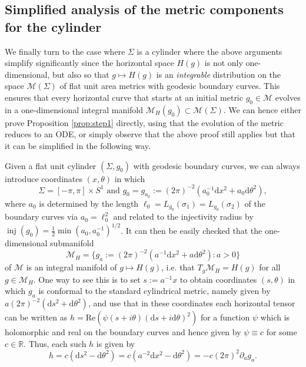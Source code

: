 \documentclass[10pt,reqno]{amsart}
\theoremstyle{plain}
\theoremstyle{definition}
\numberwithin{equation}{section}
\newcommand{\si}{\sigma}
\newcommand{\Si}{\Sigma}
\newcommand{\R}{\ensuremath{{\mathbb R}}}
\DeclareMathOperator{\inj}{inj}
\newcommand{\beq}{\begin{equation}}
\newcommand{\eeq}{\end{equation}}
\newcommand{\dd}{\mathrm{d}} %
\newcommand{\MM}{\mathcal{M}} %
\newcommand{\Rea}{\text{Re}}
\newcommand{\p}{\partial} %
\begin{document}
\subsection{Simplified analysis of the metric components for the cylinder}\label{subsec:cylinder}

We finally turn to the case where $\Si$ is a cylinder where the above arguments simplify significantly since the horizontal space $H(g)$ is not only one-dimensional, but also so that $g\mapsto H(g)$ is an \emph{integrable} distribution on the space $\MM(\Si)$ of flat unit area metrics with geodesic boundary curves. This ensures that every horizontal curve that starts at an initial metric $g_0\in \MM$ evolves in a one-dimensional integral manifold $\MM_H(g_0)\subset \MM(\Si)$. We can hence  either prove Proposition \ref{prop:step1} directly, using that the evolution of the metric reduces to an ODE, or simply observe that the above proof still applies but that it can be simplified in the following way. 

Given a flat unit cylinder $(\Si,g_0)$ with geodesic boundary curves, we can always introduce coordinates $(x,\theta)$ in which 
\beq\label{def:cyl-simple} 
    \Si= [-\pi,\pi]\times S^1 \text{ and } g_0= g_{a_0}:=(2\pi)^{-2} (a_0^{-1} \dd x^2+ a_0 \dd\theta^2),
\eeq
where $a_0$ is determined by the length $\ell_0=L_{g_0}(\si_1)=L_{g_0}(\si_2)$ of the boundary curves via $a_0=\ell_0^2$ and related to the injectivity radius by $\inj(g_0)=\frac12\min(a_0,a_0^{-1})^{1/2}$. It can then be easily checked that the one-dimensional submanifold 
\begin{equation*}
    \MM_H = \{g_a := (2\pi)^{-2} (a^{-1} \dd x^2+ a \dd\theta^2): a > 0\} 
\end{equation*}
of $\MM$ is an integral manifold of $g\mapsto H(g)$, i.e. that $T_g\MM_H=H(g)$ for all $g\in \MM_H$. One way to see this is to set $s:= a^{-1}x$ to obtain coordinates $(s,\theta)$ in which $g_a$ is conformal to the standard cylindrical metric, namely given by $a(2\pi)^{-2} (\dd s^2+\dd\theta^2)$, and use that in these coordinates each horizontal tensor can be written as $h=\Rea(\psi(s+i\theta)(\dd s+i\dd\theta)^2)$ for a function $\psi$ which is holomorphic and real on the boundary curves and hence given by $\psi\equiv c$ for some $c\in \R$. Thus, each such $h$ is given by 
\begin{equation*}
    h=c(\dd s^2-\dd\theta^2)=c(a^{-2} \dd x^2-\dd\theta^2)= -c(2\pi)^2\p_a g_a.
\end{equation*} 
\end{document}
